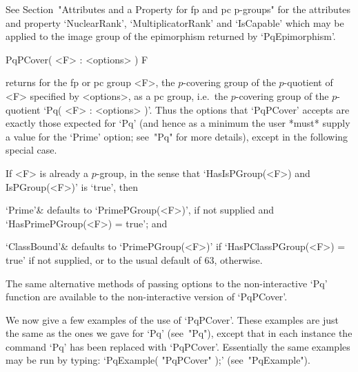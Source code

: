 See Section~"Attributes and a Property for fp and pc  p-groups"  for  the
attributes   and   property   `NuclearRank',   `MultiplicatorRank'    and
`IsCapable' which may be applied to the image group  of  the  epimorphism
returned by `PqEpimorphism'.

\>PqPCover( <F> : <options> ) F

returns for the fp or  pc  group  <F>,  the  $p$-covering  group  of  the
$p$-quotient of <F> specified by  <options>,  as  a  pc  group,  i.e.~the
$p$-covering group of the $p$-quotient `Pq( <F> : <options> )'. Thus  the
options that `PqPCover' accepts are exactly those expected for `Pq'  (and
hence as a minimum the user *must* supply a value for the `Prime' option;
see~"Pq" for more details), except in the following special case.

If <F> is already a $p$-group, in the sense  that  `HasIsPGroup(<F>)  and
IsPGroup(<F>)' is `true', then

\beginitems

`Prime'& 
defaults to `PrimePGroup(<F>)', if not supplied and  `HasPrimePGroup(<F>)
= true'; and

`ClassBound'&
defaults to `PrimePGroup(<F>)' if `HasPClassPGroup(<F>) =  true'  if  not
supplied, or to the usual default of 63, otherwise.

\enditems

The same alternative methods of passing options  to  the  non-interactive
`Pq' function are available to the non-interactive version of `PqPCover'.

We now give a few examples of the use of `PqPCover'. These  examples  are
just the same as the ones we gave for `Pq'  (see~"Pq"),  except  that  in
each instance  the  command  `Pq'  has  been  replaced  with  `PqPCover'.
Essentially  the  same  examples  may  be  run  by  typing:   `PqExample(
"PqPCover" );' (see~"PqExample").

